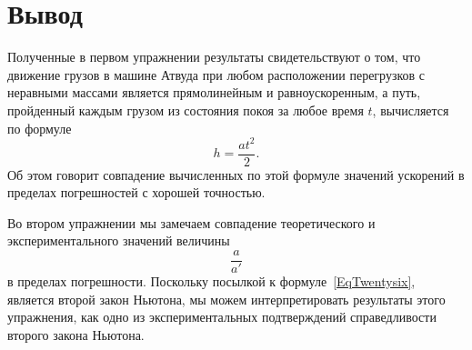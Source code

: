 \section{Вывод}

Полученные в первом упражнении результаты свидетельствуют о том, что движение грузов в машине Атвуда при любом расположении перегрузков с неравными массами является прямолинейным и равноускоренным, а путь, пройденный каждым грузом из состояния покоя за любое время $t$, вычисляется по формуле
\[
h=\frac{at^2}{2}.
\]
Об этом говорит совпадение вычисленных по этой формуле значений ускорений в пределах погрешностей с хорошей точностью.

Во втором упражнении мы замечаем совпадение теоретического и экспериментального значений величины 
\[
\frac{a}{a'}
\]
в пределах погрешности. Поскольку посылкой к формуле~\eqref{EqTwentysix}, является второй закон Ньютона, мы можем интерпретировать результаты этого упражнения, как одно из экспериментальных подтверждений справедливости второго закона Ньютона.